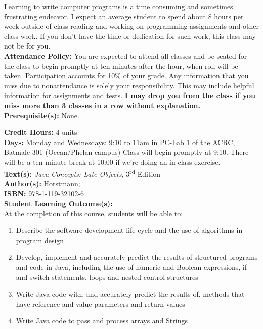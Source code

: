 \documentclass[11pt]{article}
\begin{document}
Learning to write computer programs is a time consuming and sometimes frustrating endeavor. I expect an average student to spend about 8 hours per week outside of class reading and working on programming assignments and other class work. If you don't have the time or dedication for such work, this class may not be for you.\\

\textbf {Attendance Policy:} You are expected to attend all classes and be
seated for the class to begin promptly at ten minutes after the hour, when roll
will be taken. Participation accounts for 10\% of your grade. Any information
that you miss due to nonattendance is solely your responsibility. This may
include helpful information for assignments and tests. {\bf I may drop you from
the class if you miss more than 3 classes in a row without explanation.}\\

\textbf {Prerequisite(s):} None.

\textbf {Credit Hours:} 4 units\\
\textbf {Days:} Monday and Wednesdays: 9:10 to 11am in PC-Lab 1 of the ACRC, Batmale 301 (Ocean/Phelan campus)
Class will begin promptly at 9:10. There will be a ten-minute break at 10:00 if we're doing an in-class exercise.\\
\textbf {\large Text(s):} \emph{Java Concepts: Late Objects}, 3\textsuperscript{rd} Edition\\
\textbf {Author(s):} Horstmann;\\
\textbf {ISBN:} 978-1-119-32102-6 \\

\textbf {\large Student Learning Outcome(s):} \\
At the completion of this course, students will be able to:
\begin{enumerate} \itemsep-0.4em
  \item Describe the software development life-cycle and the use of algorithms in program design
  \item Develop, implement and accurately predict the results of structured programs and code in Java, including the use of numeric and Boolean expressions, if and switch statements, loops and nested control structures
  \item Write Java code with, and accurately predict the results of, methods that have reference and value parameters and return values
  \item Write Java code to pass and process arrays and Strings
\end{enumerate}
\end{document}

